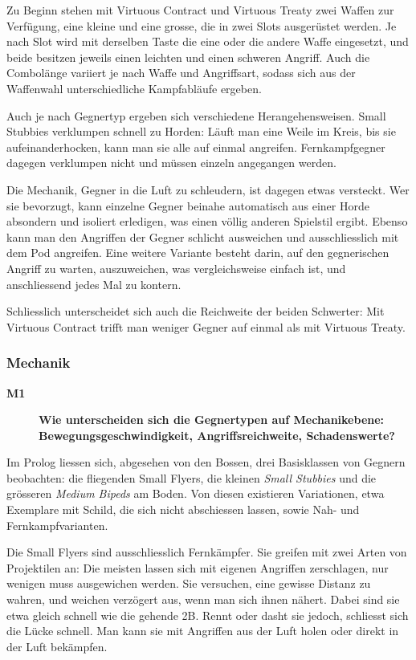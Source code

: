 \documentclass[../Main.tex]{subfiles}
\begin{document}
Zu Beginn stehen mit Virtuous Contract und Virtuous Treaty zwei Waffen zur Verfügung, eine kleine und eine grosse, die in zwei Slots ausgerüstet werden. Je nach Slot wird mit derselben Taste die eine oder die andere Waffe eingesetzt, und beide besitzen jeweils einen leichten und einen schweren Angriff. Auch die Combolänge variiert je nach Waffe und Angriffsart, sodass sich aus der Waffenwahl unterschiedliche Kampfabläufe ergeben.

Auch je nach Gegnertyp ergeben sich verschiedene Herangehensweisen. Small Stubbies verklumpen schnell zu Horden: Läuft man eine Weile im Kreis, bis sie aufeinanderhocken, kann man sie alle auf einmal angreifen. Fernkampfgegner dagegen verklumpen nicht und müssen einzeln angegangen werden.

Die Mechanik, Gegner in die Luft zu schleudern, ist dagegen etwas versteckt. Wer sie bevorzugt, kann einzelne Gegner beinahe automatisch aus einer Horde absondern und isoliert erledigen, was einen völlig anderen Spielstil ergibt. Ebenso kann man den Angriffen der Gegner schlicht ausweichen und ausschliesslich mit dem Pod angreifen. Eine weitere Variante besteht darin, auf den gegnerischen Angriff zu warten, auszuweichen, was vergleichsweise einfach ist, und anschliessend jedes Mal zu kontern.

Schliesslich unterscheidet sich auch die Reichweite der beiden Schwerter: Mit Virtuous Contract trifft man weniger Gegner auf einmal als mit Virtuous Treaty.

\subsubsection{Mechanik}

\begin{description}
    \item[\textbf{M1}] \textbf{Wie unterscheiden sich die Gegnertypen auf Mechanikebene: Bewegungsgeschwindigkeit, Angriffsreichweite, Schadenswerte?}
\end{description}

Im Prolog liessen sich, abgesehen von den Bossen, drei Basisklassen von Gegnern beobachten: die fliegenden Small Flyers, die kleinen \textit{Small Stubbies} und die grösseren \textit{Medium Bipeds} am Boden. Von diesen existieren Variationen, etwa Exemplare mit Schild, die sich nicht abschiessen lassen, sowie Nah- und Fernkampfvarianten.

Die Small Flyers sind ausschliesslich Fernkämpfer. Sie greifen mit zwei Arten von Projektilen an: Die meisten lassen sich mit eigenen Angriffen zerschlagen, nur wenigen muss ausgewichen werden. Sie versuchen, eine gewisse Distanz zu wahren, und weichen verzögert aus, wenn man sich ihnen nähert. Dabei sind sie etwa gleich schnell wie die gehende 2B. Rennt oder dasht sie jedoch, schliesst sich die Lücke schnell. Man kann sie mit Angriffen aus der Luft holen oder direkt in der Luft bekämpfen.
\end{document}
